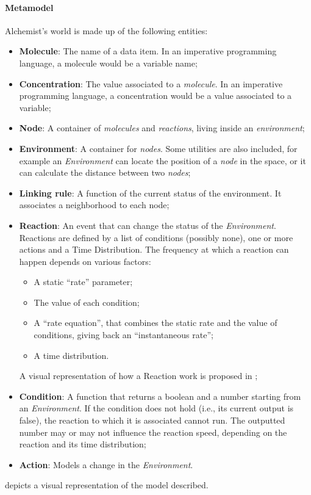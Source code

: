 \paragraph{Metamodel} Alchemist's world is made up of the following entities:
\begin{itemize}
	\item \textbf{Molecule}: The name of a data item. In an imperative programming language, a molecule would be a variable name;
	\item \textbf{Concentration}: The value associated to a \textit{molecule}. In an imperative programming language, a concentration would be a value associated to a variable;
	\item \textbf{Node}: A container of \textit{molecules} and \textit{reactions}, living inside an \textit{environment};
	\item \textbf{Environment}: A container for \textit{nodes}. Some utilities are also included, for example an \textit{Environment} can locate the position of a \textit{node} in the space, or it can calculate the distance between two \textit{nodes};
	\item \textbf{Linking rule}: A function of the current status of the environment. It associates a neighborhood to each node;
	\item \textbf{Reaction}: An event that can change the status of the \textit{Environment}. Reactions are defined by a list of conditions (possibly none), one or more actions and  a Time Distribution. The frequency at which a reaction can happen depends on various factors:
	\begin{itemize}
		\item A static “rate” parameter;
		\item The value of each condition;
		\item A “rate equation”, that combines the static rate and the value of conditions, giving back an “instantaneous rate”;
		\item A time distribution.
	\end{itemize}
	A visual representation of how a Reaction work is proposed in ;
	\item \textbf{Condition}: A function that returns a boolean and a number starting from an \textit{Environment}. If the condition does not hold (i.e., its current output is false), the reaction to which it is associated cannot run.
	The outputted number may or may not influence the reaction speed, depending on the reaction and its time distribution;
	\item \textbf{Action}: Models a change in the \textit{Environment}.
\end{itemize}
 depicts a visual representation of the model described.

